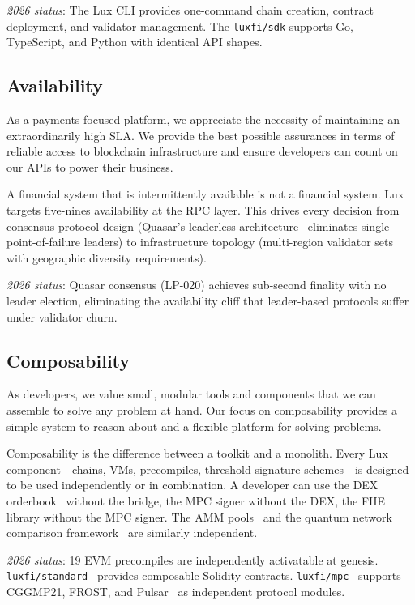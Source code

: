 \documentclass[11pt,a4paper]{article}
\begin{document}
\medskip\noindent\textit{2026 status}: The Lux CLI provides one-command
chain creation, contract deployment, and validator management. The
\texttt{luxfi/sdk} supports Go, TypeScript, and Python with identical
API shapes.

\subsection{Availability}

As a payments-focused platform, we appreciate the necessity of
maintaining an extraordinarily high SLA. We provide the best possible
assurances in terms of reliable access to blockchain infrastructure
and ensure developers can count on our APIs to power their business.

A financial system that is intermittently available is not a financial
system. Lux targets five-nines availability at the RPC layer. This
drives every decision from consensus protocol design (Quasar's
leaderless architecture~\cite{lp105} eliminates single-point-of-failure leaders) to
infrastructure topology (multi-region validator sets with geographic
diversity requirements).

\medskip\noindent\textit{2026 status}: Quasar consensus (LP-020)
achieves sub-second finality with no leader election, eliminating
the availability cliff that leader-based protocols suffer under
validator churn.

\subsection{Composability}

As developers, we value small, modular tools and components that we can
assemble to solve any problem at hand. Our focus on composability
provides a simple system to reason about and a flexible platform for
solving problems.

Composability is the difference between a toolkit and a monolith. Every
Lux component---chains, VMs, precompiles, threshold signature
schemes---is designed to be used independently or in combination. A
developer can use the DEX orderbook~\cite{lp306} without the bridge, the MPC signer
without the DEX, the FHE library without the MPC signer. The AMM pools~\cite{lp308}
and the quantum network comparison framework~\cite{lp309} are similarly independent.

\medskip\noindent\textit{2026 status}: 19 EVM precompiles are
independently activatable at genesis. \texttt{luxfi/standard}~\cite{lux-standard} provides
composable Solidity contracts. \texttt{luxfi/mpc}~\cite{lux-mpc} supports CGGMP21,
FROST, and Pulsar~\cite{lux-corona} as independent protocol modules.
\end{document}
